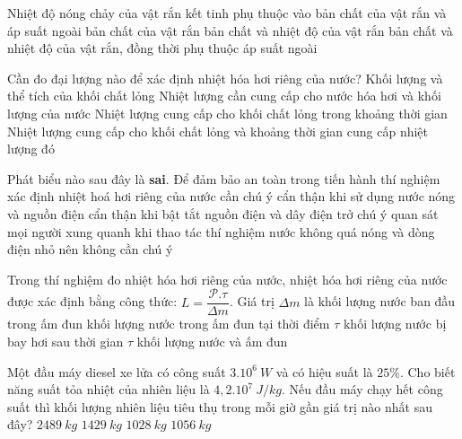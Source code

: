 \begin{ex}%
	Nhiệt độ nóng chảy của vật rắn kết tinh phụ thuộc vào
	\choice
	{\True bản chất của vật rắn và áp suất ngoài}
	{bản chất của vật rắn}
	{bản chất và nhiệt độ của vật rắn}
	{bản chất và nhiệt độ của vật rắn, đồng thời phụ thuộc áp suất ngoài}
	\loigiai{
		
	}
\end{ex}

\begin{ex}%
	Cần đo đại lượng nào để xác định nhiệt hóa hơi riêng của nước?
	\choice
	{Khối lượng và thể tích của khối chất lỏng}
	{Nhiệt lượng cần cung cấp cho nước hóa hơi và khối lượng của nước}
	{\True Nhiệt lượng cung cấp cho khối chất lỏng trong khoảng thời gian}
	{Nhiệt lượng cung cấp cho khối chất lỏng và khoảng thời gian cung cấp nhiệt lượng đó}
	\loigiai{
		
	}
\end{ex}

\begin{ex}%
	Phát biểu nào sau đây là \textbf{sai}. Để đảm bảo an toàn trong tiến hành thí nghiệm xác định nhiệt hoá hơi riêng của nước cần chú ý
	\choice
	{cẩn thận khi sử dụng nước nóng và nguồn điện}
	{cẩn thận khi bật tắt nguồn điện và dây điện trở}
	{chú ý quan sát mọi người xung quanh khi thao tác thí nghiệm}
	{\True nước không quá nóng và dòng điện nhỏ nên không cần chú ý}
	\loigiai{
		
	}
\end{ex}

\begin{ex}%
	Trong thí nghiệm đo nhiệt hóa hơi riêng của nước, nhiệt hóa hơi riêng của nước được xác định bằng công thức: $L = \dfrac{\mathcal{P}.\tau}{\Delta m}$. Giá trị $\Delta m$ là
	\choice
	{khối lượng nước ban đầu trong ấm đun}
	{khối lượng nước trong ấm đun tại thời điểm $\tau$}
	{\True khối lượng nước bị bay hơi sau thời gian $\tau$}
	{khối lượng nước và ấm đun}
	\loigiai{
		
	}
\end{ex}

\begin{ex}%
	Một đầu máy diesel xe lửa có công suất $3.10^6\ W$ và có hiệu suất là $25\%$. Cho biết năng suất tỏa nhiệt của nhiên liệu là $4,2.10^7\ J/kg$. Nếu đầu máy chạy hết công suất thì khối lượng nhiên liệu tiêu thụ trong mỗi giờ gần giá trị nào nhất sau đây?
	\choice
	{$2489\ kg$}
	{$1429\ kg$}
	{$1028\ kg$}
	{$1056\ kg$}
\end{ex}

